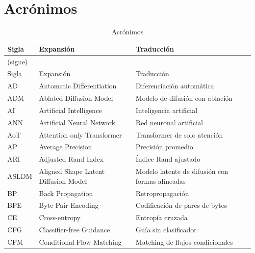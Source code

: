 \documentclass[../book-main_es.tex]{subfiles}
\begin{document}
\chapter*{Acrónimos}\label{ch:acronyms}

\begin{longtable}{@{} p{} @{\hspace{1em}} p{} @{\hspace{1em}} p{}}
\caption{Acrónimos} \label{tab:acronyms} \\
\hline
Sigla & Expansión & Traducción \\
\hline
\endfirsthead
\multicolumn{3}{l}{\small (sigue)} \\
\hline
Sigla & Expansión & Traducción \\
\hline
\endhead
AD & Automatic Differentiation & Diferenciación automática \\
ADM & Ablated Diffusion Model & Modelo de difusión con ablación \\
AI & Artificial Intelligence & Inteligencia artificial \\
ANN & Artificial Neural Network & Red neuronal artificial \\
AoT & Attention only Transformer & Transformer de solo atención \\
AP & Average Precision  & Precisión promedio \\
ARI & Adjusted Rand Index & Índice Rand ajustado \\
ASLDM & Aligned Shape Latent Diffusion Model & Modelo latente de difusión con formas alineadas \\
BP & Back Propagation & Retropropagación \\
BPE & Byte Pair Encoding & Codificación de pares de bytes \\
CE & Cross-entropy & Entropía cruzada \\
CFG & Classifier-free Guidance & Guía sin clasificador \\
CFM & Conditional Flow Matching & Matching de flujos condicionales \\

\end{longtable}
\end{document}
